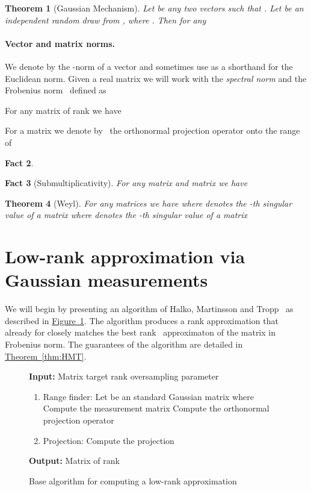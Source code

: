 \documentclass[letterpaper,11pt]{article}
\newtheorem{theorem}{Theorem}[section]
\newtheorem{fact}[theorem]{Fact}
\theoremstyle{definition}
\newcommand{\factlabel}[1]{\label{fact:#1}}
\newcommand{\figurelabel}[1]{\label{fig:#1}}
\newcommand{\figureref}[1]{\hyperref[fig:#1]{Figure~\ref{fig:#1}}}
\newcommand{\theoremref}[1]{\hyperref[thm:#1]{Theorem~\ref{thm:#1}}}
\begin{document}
\begin{theorem}[Gaussian Mechanism]
\label{thm:Gaussian}
Let  be any two vectors such that .
Let  be an independent random draw from ,
where . Then for any  
\end{theorem}

\paragraph{Vector and matrix norms.} We denote by  the
-norm of a vector and sometimes use  as a shorthand for the
Euclidean norm. Given a real  matrix  we will work with the
\emph{spectral norm}  and the Frobenius norm~ defined as

For any  matrix  of rank  we have

For a matrix  we denote by~
the orthonormal projection operator onto the range of 
\begin{fact}\label{fac:projection}

\end{fact}

\begin{fact}[Submultiplicativity]\factlabel{sub}
For any  matrix  and  matrix  we have

\end{fact}

\begin{theorem}[Weyl]\label{thm:weyl}
For any  matrices  we have
 where 
denotes the -th singular value of a matrix  where  denotes
the -th singular value of a matrix~
\end{theorem}

\section{Low-rank approximation via Gaussian measurements}

We will begin by presenting an algorithm of Halko, Martinsson and
Tropp~\cite{HalkoMT11} as described in \figureref{HMT}.  The algorithm
produces a rank  approximation that already for  closely matches
the best rank~ approximaton of the matrix in Frobenius norm. The guarantees
of the algorithm are detailed in \theoremref{HMT}.

\begin{figure}[h]
\begin{boxedminipage}{\textwidth}
{\bf Input:} Matrix  target rank  oversampling
parameter 
\begin{enumerate}
\item {\sc Range finder:}
Let  be an  standard Gaussian matrix where 
Compute the  measurement matrix  Compute the
orthonormal projection operator 
\item {\sc Projection:} Compute the projection 
\end{enumerate}
{\bf Output:} Matrix  of rank 
\end{boxedminipage}
\caption{Base algorithm for computing a low-rank approximation}
\figurelabel{HMT}
\end{figure}
\end{document}
